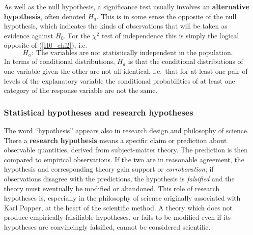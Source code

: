As well as the null hypothesis, a significance test usually involves
an \textbf{alternative hypothesis}, often denoted $H_{a}$. This
is in some sense the opposite of the null hypothesis, which
indicates the kinds of observations that will be taken as evidence against
$H_{0}$. For the $\chi^{2}$ test of independence this is simply the logical
opposite of (\ref{H0_chi2}), i.e.\
\begin{equation}
H_{a}: \;\text{The variables are not statistically independent in the
population}.
\label{Ha_chi2}
\end{equation}
In terms of conditional distributions, $H_{a}$ is that the conditional
distributions of one variable given the other are not all identical,
i.e.\ that for at least one pair of levels of the explanatory variable
the conditional probabilities of at least one category of the response
variable are not the same.

\subsubsection{Statistical hypotheses and research hypotheses}

The word ``hypothesis'' appears also in research design and
philosophy of science. There a \textbf{research hypothesis} means a
specific claim or prediction about observable quantities, derived
from subject-matter theory. The prediction is then compared to
empirical observations. If the two are in reasonable agreement, the
hypothesis and corresponding theory gain support or
\emph{corroboration}; if observations disagree with the predictions,
the hypothesis is \emph{falsified} and the theory must eventually be
modified or abandoned. This role of research hypotheses is, especially
in the philosophy of science originally associated with Karl Popper, at
the heart of the scientific method. A theory which does not
produce empirically falsifiable hypotheses, or fails to be
modified even if its hypotheses are convincingly falsified, cannot be
considered scientific.

